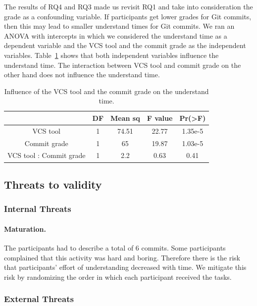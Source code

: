 \documentclass[letterpaper]{article}
\begin{document}
The results of RQ4 and RQ3 made us revisit RQ1 and take into consideration the grade as a confounding variable.
If participants get lower grades for Git commits, then this may lead to smaller understand times for Git commits.
We ran an ANOVA with intercepts in which we considered the understand time as a dependent variable and the VCS tool and the commit grade as the independent variables.
Table~\ref{tab:rq4_anovas} shows that both independent variables influence the understand time.
The interaction between VCS tool and commit grade on the other hand does not influence the understand time.

\begin{table}[H]
	\centering
	\begin{tabular}{c | c c c c}
											& DF	&	Mean sq	&	F value	&	Pr(\textgreater F)	\\ \hline
	VCS tool 							& 1	&	74.51		&	22.77	&	1.35e-5					\\ 
	Commit grade					& 1	&	65			&	19.87	&	1.03e-5					\\
	VCS tool : Commit grade	& 1	&	2.2			&	0.63	&	0.41						\\
	\end{tabular}
	\caption{Influence of the VCS tool and the commit grade on the understand time.}
	\label{tab:rq4_anovas}
\end{table}

\subsection{Threats to validity}

\subsubsection{Internal Threats}

\paragraph{Maturation.}
The participants had to describe a total of 6 commits.
Some participants complained that this activity was hard and boring.
Therefore there is the risk that participants' effort of understanding decreased with time.
We mitigate this risk by randomizing the order in which each participant received the tasks.

\subsubsection{External Threats}
\end{document}
